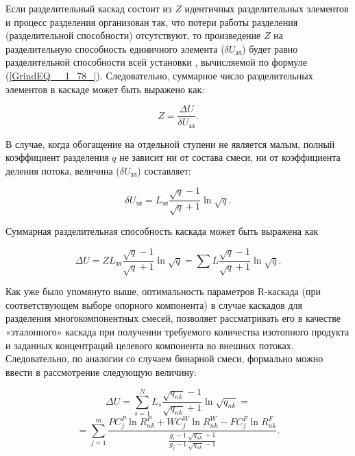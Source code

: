 Если разделительный каскад состоит из $Z$ идентичных разделительных элементов и процесс разделения организован так, что потери работы разделения (разделительной способности) отсутствуют, то произведение $Z$ на разделительную способность единичного элемента ($\delta U_{\text{эл}}$) будет равно разделительной способности всей установки  , вычисляемой по формуле (\ref{GrindEQ__1_78_}). Следовательно, суммарное число разделительных элементов в каскаде может быть выражено как:

\begin{equation} \label{GrindEQ__1_80_} 
  Z=\frac{\Delta U}{\delta U_{\text{эл}}} .               
\end{equation} 

В случае, когда обогащение на отдельной ступени не является малым, полный коэффициент разделения $q$ не зависит ни от состава смеси, ни от коэффициента деления потока, величина ($\delta U_{\text{эл}}$) составляет:

\begin{equation} \label{GrindEQ__1_81_} 
  \delta U_{\text{эл}} =L_{\text{эл}} \frac{\sqrt{q} -1}{\sqrt{q} +1} \ln \sqrt{q}.                             
\end{equation}

Суммарная разделительная способность каскада может быть выражена как

\begin{equation} \label{GrindEQ__1_82_} 
  \Delta U=ZL_{\text{эл}} \frac{\sqrt{q} -1}{\sqrt{q} +1} \ln \sqrt{q} =\sum L \frac{\sqrt{q} -1}{\sqrt{q} +1} \ln \sqrt{q} .             
\end{equation} 

Как уже было упомянуто выше, оптимальность параметров R-каскада (при соответствующем выборе опорного компонента) в случае каскадов для разделения многокомпонентных смесей, позволяет рассматривать его в качестве «эталонного» каскада при получении требуемого количества изотопного продукта и заданных концентраций целевого компонента во внешних потоках. Следовательно, по аналогии со случаем бинарной смеси, формально можно ввести в рассмотрение следующую величину:

\[\Delta U=\sum _{s=1}^{N}L_{s}  \frac{\sqrt{q_{nk} } -1}{\sqrt{q_{nk} } +1} \ln \sqrt{q_{nk} } =\] 
\begin{equation} \label{GrindEQ__1_83_} 
=\sum _{j=1}^{m}\frac{PC_{j}^{P} \ln R_{nk}^{P} +WC_{j}^{W} \ln R_{nk}^{W} -FC_{j}^{F} \ln R_{nk}^{F} }{\frac{g_{i} -1}{g_{j} -1} \frac{\sqrt{q_{nk} } +1}{\sqrt{q_{nk} } -1} }  .              
\end{equation} 

